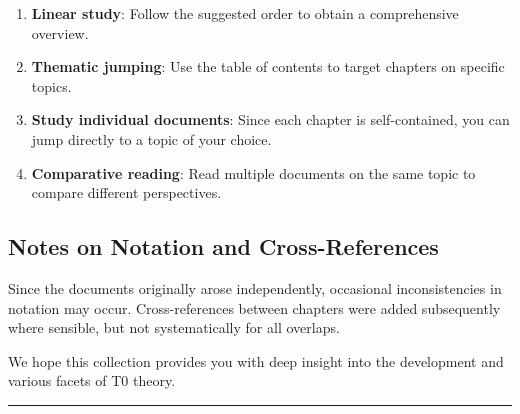 \begin{enumerate}
\item \textbf{Linear study}: Follow the suggested order to obtain a comprehensive overview.

\item \textbf{Thematic jumping}: Use the table of contents to target chapters on specific topics.

\item \textbf{Study individual documents}: Since each chapter is self-contained, you can jump directly to a topic of your choice.

\item \textbf{Comparative reading}: Read multiple documents on the same topic to compare different perspectives.
\end{enumerate}

\subsection*{Notes on Notation and Cross-References}

Since the documents originally arose independently, occasional inconsistencies in notation may occur. Cross-references between chapters were added subsequently where sensible, but not systematically for all overlaps.

\vspace{1em}
\noindent
We hope this collection provides you with deep insight into the development and various facets of T0 theory.

\vfill

\begin{center}
\rule{0.5\textwidth}{0.4pt}
\end{center}
